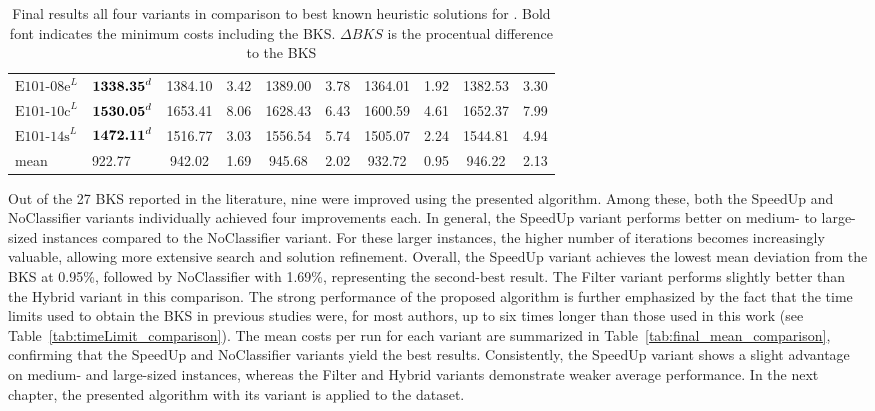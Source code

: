 \begin{table}[ht]
\begin{tabular}{@{}llcccccccc@{}}
        $\text{E101-08e}^L$ & $\text{\textbf{1338.35}}^d$ & 1384.10                          & 3.42                       & 1389.00                     & 3.78                       & 1364.01          & 1.92         & 1382.53         & 3.30         \\
        $\text{E101-10c}^L$ & $\text{\textbf{1530.05}}^d$ & 1653.41                          & 8.06                       & 1628.43                     & 6.43                       & 1600.59          & 4.61         & 1652.37         & 7.99         \\
        $\text{E101-14s}^L$ & $\text{\textbf{1472.11}}^d$ & 1516.77                          & 3.03                       & 1556.54                     & 5.74                       & 1505.07          & 2.24         & 1544.81         & 4.94         \\\hline
        mean                & 922.77                      & 942.02                           & 1.69                       & 945.68                      & 2.02                       & 932.72           & 0.95         & 946.22          & 2.13         \\
        \bottomrule
    \end{tabular}
    \caption[Final results all four variants in comparison to best known heuristic solutions for \gendreauDataSet]
    {Final results all four variants in comparison to best known heuristic solutions for \gendreauDataSet. Bold font indicates the
        minimum costs including the BKS. $\Delta BKS$ is the procentual difference to the BKS}
    \label{tab:final_best_results_gendreau}
\end{table}

Out of the 27 \gls{BKS} reported in the literature, nine were improved using the presented algorithm. Among these,
both the SpeedUp and NoClassifier variants individually achieved four improvements each. In general, the SpeedUp variant performs
better on medium- to large-sized instances compared to the NoClassifier variant. For these larger instances, the higher number of
iterations becomes increasingly valuable, allowing more extensive search and solution refinement.
Overall, the SpeedUp variant achieves the lowest mean deviation from the \gls{BKS} at 0.95\%, followed by NoClassifier with 1.69\%,
representing the second-best result. The Filter variant performs slightly better than the Hybrid variant in this comparison. The
strong performance of the proposed algorithm is further emphasized by the fact that the time limits used to obtain the \gls{BKS}
in previous studies were, for most authors, up to six times longer than those used in this work (see Table~\ref{tab:timeLimit_comparison}).
The mean costs per run for each variant are summarized in Table~\ref{tab:final_mean_comparison}, confirming that the SpeedUp
and NoClassifier variants yield the best results. Consistently, the SpeedUp variant shows a slight advantage on medium- and large-sized
instances, whereas the Filter and Hybrid variants demonstrate weaker average performance. In the next chapter, the presented
algorithm with its variant is applied to the \krebsADataSetText dataset.